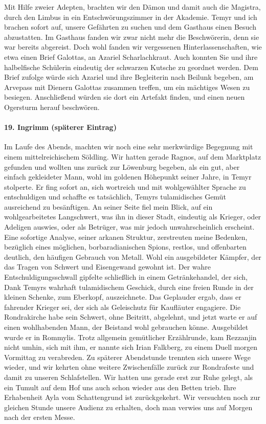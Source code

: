 Mit Hilfe zweier Adepten, brachten wir den Dämon und damit auch die Magistra, durch den Limbus in ein Entschwörungszimmer in der Akademie. Temyr und ich brachen sofort auf, unsere Gefährten zu suchen und dem Gasthaus einen Besuch abzustatten.
Im Gasthaus fanden wir zwar nicht mehr die Beschwörerin, denn sie war bereits abgereist. Doch wohl fanden wir vergessenen Hinterlassenschaften, wie etwa einen Brief Galottas, an Azariel Scharlachkraut. Auch konnten Sie und ihre halbelfische Schülerin eindeutig der schwarzen Kutsche zu geordnet werden. Dem Brief zufolge würde sich Azariel und ihre Begleiterin nach Beilunk begeben, am Arvepass mit Dienern Galottas zusammen treffen, um ein mächtiges Wesen zu besiegen. Anschließend würden sie dort ein Artefakt finden, und einen neuen Ogersturm herauf beschwören.

\paragraph{19. Ingrimm (späterer Eintrag)}
Im Laufe des Abends, machten wir noch eine sehr merkwürdige Begegnung mit einem mittelreichischem Söldling. Wir hatten gerade Ragnos, auf dem Marktplatz gefunden und wollten uns zurück zur Löwenburg begeben, als ein gut, aber einfach gekleideter Mann, wohl im goldenen Höhepunkt seiner Jahre, in Temyr stolperte. Er fing sofort an, sich wortreich und mit wohlgewählter Sprache zu entschuldigen und schaffte es tatsächlich, Temyrs tulamidisches Gemüt ausreichend zu besänftigen. An seiner Seite fiel mein Blick, auf ein wohlgearbeitetes Langschwert, was ihn in dieser Stadt, eindeutig als Krieger, oder Adeligen auswies, oder als Betrüger, was mir jedoch unwahrscheinlich erscheint. Eine sofortige Analyse, seiner arkanen Struktur, zerstreuten meine Bedenken, bezüglich eines möglichen, borbaradianischen Spions, restlos, und offenbarten deutlich, den häufigen Gebrauch von Metall. Wohl ein ausgebildeter Kämpfer, der das Tragen von Schwert und Eisengewand gewohnt ist. Der wahre Entschuldigungsschwall gipfelte schließlich in einem Getränkehandel, der sich, Dank Temyrs wahrhaft tulamidischem Geschick, durch eine freien Runde in der kleinen Schenke, zum Eberkopf, auszeichnete. Das Geplauder ergab, dass er fahrender Krieger sei, der sich als Geleischutz für Kaufläuter engagiere. Die Rondrakirche habe sein Schwert, ohne Beitritt, abgelehnt, und jetzt warte er auf einen wohlhabenden Mann, der Beistand wohl gebrauchen könne. Ausgebildet wurde er in Rommylis. Trotz allgemein gemütlicher Erzählrunde, kam Rezzanjin nicht umhin, sich mit ihm, er nannte sich Irian Falkberg, zu einem Duell morgen Vormittag zu verabreden. Zu späterer Abendstunde trennten sich unsere Wege wieder, und wir kehrten ohne weitere Zwischenfälle zurück zur Rondrafeste und damit zu unseren Schlafstellen.
Wir hatten uns gerade erst zur Ruhe gelegt, als ein Tumult auf dem Hof uns auch schon wieder aus den Betten trieb. Ihre Erhabenheit Ayla vom Schattengrund ist zurückgekehrt. Wir versuchten noch zur gleichen Stunde unsere Audienz zu erhalten, doch man verwies uns auf Morgen nach der ersten Messe.


